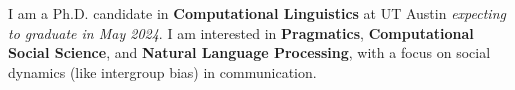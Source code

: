 I am a Ph.D. candidate in \textbf{Computational Linguistics} at UT Austin \emph{expecting to graduate in May 2024}. I am interested in \textbf{Pragmatics}, \textbf{Computational Social Science}, and \textbf{Natural Language Processing}, with a focus on social dynamics (like intergroup bias) in communication.
